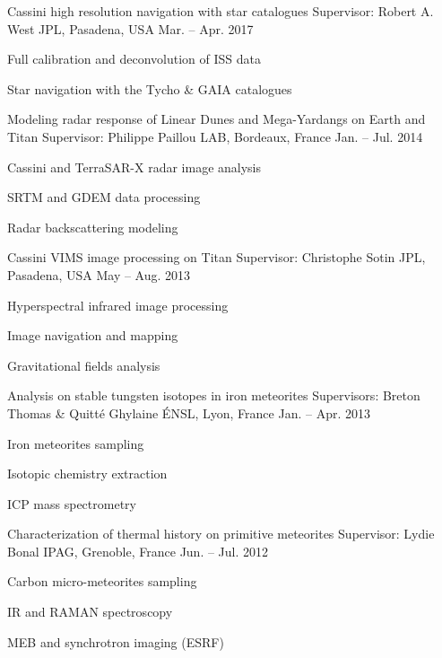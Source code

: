 
\begin{cventries}

  \cventry
    {Cassini high resolution navigation with star catalogues}
    {Supervisor: Robert A. West}
    {JPL, Pasadena, USA}
    {Mar. -- Apr. 2017}
    {
      \begin{cvitems}
        \item{Full calibration and deconvolution of ISS data}
        \item{Star navigation with the Tycho \& GAIA catalogues}
      \end{cvitems}
    }

  \cventry
    {Modeling radar response of Linear Dunes and Mega-Yardangs on Earth and Titan}
    {Supervisor: Philippe Paillou}
    {LAB, Bordeaux, France}
    {Jan. -- Jul. 2014}
    {
      \begin{cvitems}
        \item{Cassini and TerraSAR-X radar image analysis}
        \item{SRTM and GDEM data processing}
        \item{Radar backscattering modeling}
      \end{cvitems}
    }

  \cventry
    {Cassini VIMS image processing on Titan}
    {Supervisor: Christophe Sotin}
    {JPL, Pasadena, USA}
    {May -- Aug. 2013}
    {
      \begin{cvitems}
        \item{Hyperspectral infrared image processing}
        \item{Image navigation and mapping}
        \item{Gravitational fields analysis}
      \end{cvitems}
    }

  \cventry
    {Analysis on stable tungsten isotopes in iron meteorites}
    {Supervisors: Breton Thomas \& Quitté Ghylaine}
    {ÉNSL, Lyon, France}
    {Jan. -- Apr. 2013}
    {
      \begin{cvitems}
        \item{Iron meteorites sampling}
        \item{Isotopic chemistry extraction}
        \item{ICP mass spectrometry}
      \end{cvitems}
    }

  \cventry
    {Characterization of thermal history on primitive meteorites}
    {Supervisor: Lydie Bonal}
    {IPAG, Grenoble, France}
    {Jun. -- Jul. 2012}
    {
      \begin{cvitems}
        \item{Carbon micro-meteorites sampling}
        \item{IR and RAMAN spectroscopy}
        \item{MEB and synchrotron imaging (ESRF)}
      \end{cvitems}
    }


\end{cventries}
